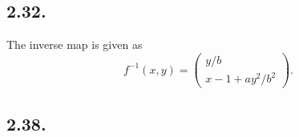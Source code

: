 \documentclass[a4paper,11pt,fleqn]{article}
\begin{document}
\subsection{2.32.}
The inverse map is given as
\begin{equation}
    f^{-1}(x,y) =\left(\begin{array}{c}
        y/b \\
        x -1 + ay^2/b^2
    \end{array} \right) .
\end{equation}
\hruleskip

\subsection{2.38.}
\end{document}
